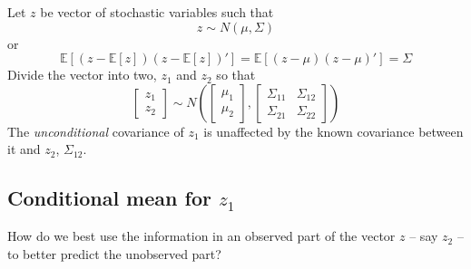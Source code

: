 \documentclass[
  letterpaper,
]{book}
\begin{document}
Let \(z\) be vector of stochastic variables such that \[
  z\sim N(\mu,\Sigma)
\] or \[
\mathbb{E}\left[ \left(z-\mathbb{E}[z]\right) \left(z-\mathbb{E}[z]\right)' \right] = \mathbb{E}\left[ \left(z-\mu\right) \left(z-\mu\right)'\right] = \Sigma
\] Divide the vector into two, \(z_1\) and \(z_2\) so that \[
\begin{bmatrix}
z_1 \\ 
z_2
\end{bmatrix}
\sim N\left( 
\begin{bmatrix}
\mu_1 \\ 
\mu_2
\end{bmatrix},
\begin{bmatrix}
\Sigma_{11} & \Sigma_{12} \\ 
\Sigma_{21} & \Sigma_{22}
\end{bmatrix}
\right)
\] The \emph{unconditional} covariance of \(z_1\) is unaffected by the
known covariance between it and \(z_2\), \(\Sigma_{12}\).

\hypertarget{conditional-mean-for-z_1}{%
\subsection{\texorpdfstring{Conditional mean for
\(z_1\)}{Conditional mean for z\_1}}\label{conditional-mean-for-z_1}}

How do we best use the information in an observed part of the vector
\(z\) -- say \(z_2\) -- to better predict the unobserved part?
\end{document}
